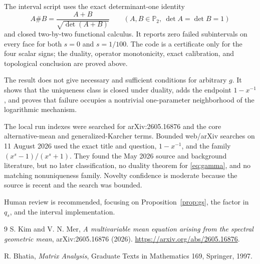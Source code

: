 \documentclass[11pt]{article}
\newcommand{\Pcone}{\mathbb P}
\begin{document}
The interval script uses the exact determinant-one identity
\[
 A\#B=\frac{A+B}{\sqrt{\det(A+B)}}\qquad
 (A,B\in\Pcone_2,\ \det A=\det B=1)
\]
and closed two-by-two functional calculus.  It reports zero failed
subintervals on every face for both \(s=0\) and \(s=1/100\).  The code is a
certificate only for the four scalar signs; the duality, operator
monotonicity, exact calibration, and topological conclusion are proved above.

The result does not give necessary and sufficient conditions for arbitrary
\(g\).  It shows that the uniqueness class is closed under duality, adds the
endpoint \(1-x^{-1}\), and proves that failure occupies a nontrivial
one-parameter neighborhood of the logarithmic mechanism.

The local run indexes were searched for arXiv:2605.16876 and the core
alternative-mean and generalized-Karcher terms.  Bounded web/arXiv searches
on 11 August 2026 used the exact title and question, \(1-x^{-1}\), and the
family \((x^s-1)/(x^s+1)\).  They found the May 2026 source and background
literature, but no later classification, no duality theorem for
\eqref{eq:gamma}, and no matching nonuniqueness family.  Novelty confidence is
moderate because the source is recent and the search was bounded.

Human review is recommended, focusing on Proposition~\ref{prop:gs}, the
factor in \(q_s\), and the interval implementation.

\begin{thebibliography}{9}
S. Kim and V. N. Mer,
\emph{A multivariable mean equation arising from the spectral geometric
mean}, arXiv:2605.16876 (2026).
\url{https://arxiv.org/abs/2605.16876}.

R. Bhatia,
\emph{Matrix Analysis}, Graduate Texts in Mathematics 169,
Springer, 1997.
\end{thebibliography}
\end{document}
